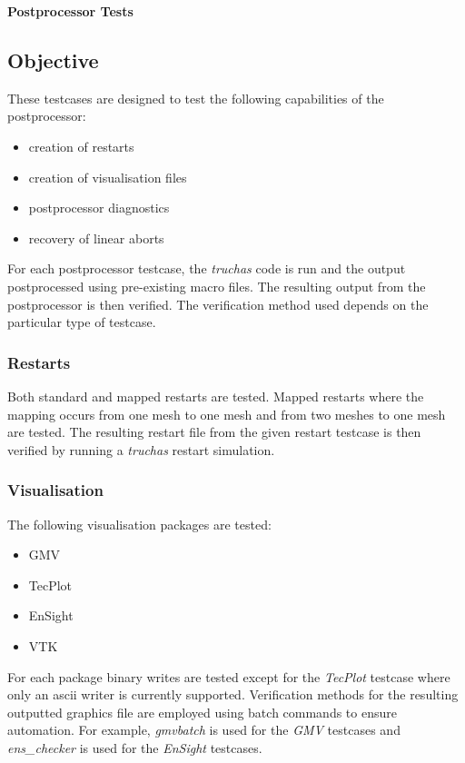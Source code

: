 \documentclass[12pt]{article}
\begin{document}
\begin{center}
{\large {\bf Postprocessor Tests}}
\end{center}

\subsection*{Objective}

These testcases are designed to test the following capabilities of the 
postprocessor:
\begin{itemize}
\item creation of restarts 
\item creation of visualisation files
\item postprocessor diagnostics
\item recovery of linear aborts
\end{itemize}

For each postprocessor testcase, the {\em{truchas}} code is run and the output
postprocessed using pre-existing macro files. The resulting output 
from the postprocessor is then verified. The verification method used depends
on the particular type of testcase.

\subsubsection*{Restarts}

Both standard and mapped restarts are tested. Mapped restarts where
the mapping occurs from one mesh to one mesh and from two meshes to one mesh
are tested. The resulting restart file from the given restart testcase
is then verified by running a {\em{truchas}} restart simulation.

\subsubsection*{Visualisation}

The following visualisation packages are tested:
\begin{itemize}
\item GMV
\item TecPlot
\item EnSight
\item VTK
\end{itemize}
For each package binary writes are tested except for the {\em{TecPlot}}
testcase where only an ascii writer is currently supported. Verification methods
for the resulting outputted graphics file are employed using batch commands
to ensure automation. For example, {\em{gmvbatch}} is used for the {\em{GMV}} 
testcases and {\em{ens\_checker}} is used for the {\em{EnSight}} testcases.
\end{document}
